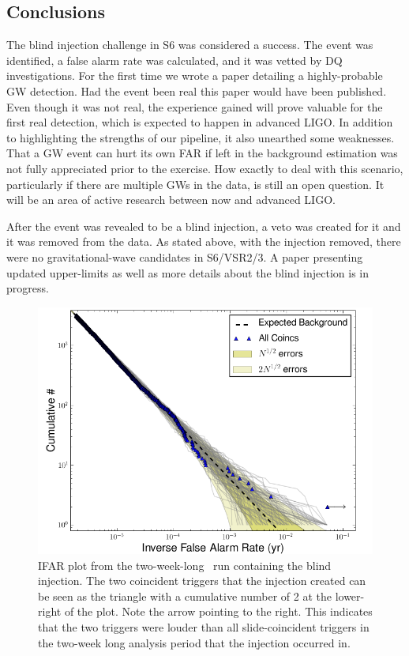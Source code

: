 \subsection{Conclusions}

The blind injection challenge in S6 was considered a success. The event was
identified, a false alarm rate was calculated, and it was vetted by \ac{DQ}
investigations. For the first time we wrote a paper detailing a highly-probable
\ac{GW} detection. Had the event been real this paper would have been
published. Even though it was not real, the experience gained will prove
valuable for the first real detection, which is expected to happen in  advanced
LIGO. In addition to highlighting the strengths of our pipeline, it also
unearthed some weaknesses. That a \ac{GW} event can hurt its own \ac{FAR} if
left in the background estimation was not fully appreciated prior to the
exercise. How exactly to deal with this scenario, particularly if there are
multiple \acp{GW} in the data, is still an open question. It will be an area of
active research between now and advanced LIGO.

After the event was revealed to be a blind injection, a veto was created for it
and it was removed from the data. As stated above, with the injection removed,
there were no gravitational-wave candidates in S6/VSR2/3. A paper presenting
updated upper-limits as well as more details about the blind injection is in
progress.

\begin{figure}[p]
\center
\includegraphics[width=6in]{figures/big_dog/H1L1V1-ligolw_cbc_plotifar_FULL_DATA_CAT_4_VETO_cumhist_combined_ifar_ALL_DATA_PLOTTED_OPEN_BOX-967593543-1209744.png}
\caption{IFAR plot from the two-week-long \ihope~run containing the blind
injection. The two coincident triggers that the injection created can be seen
as the triangle with a cumulative number of 2 at the lower-right of the plot.
Note the arrow pointing to the right. This indicates that the two triggers were
louder than all slide-coincident triggers in the two-week long analysis period
that the injection occurred in.}
\label{fig:big_dog-ifar}
\end{figure}

